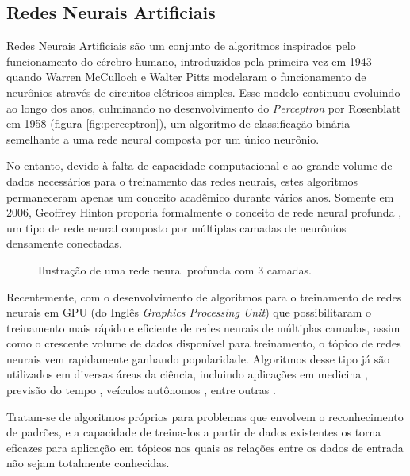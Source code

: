 \subsection{Redes Neurais Artificiais}
\label{sec:ann}

Redes Neurais Artificiais são um conjunto de algoritmos inspirados pelo funcionamento do cérebro humano, introduzidos pela primeira vez em 1943 quando Warren McCulloch e Walter Pitts modelaram o funcionamento de neurônios através de circuitos elétricos simples\cite{mccullochLogicalCalculusIdeas1943}. 
Esse modelo continuou evoluindo ao longo dos anos, culminando no desenvolvimento do \textit{Perceptron} por Rosenblatt em 1958 \cite{rosenblattPerceptronProbabilisticModel1958} (figura \ref{fig:perceptron}), um algoritmo de classificação binária semelhante a uma rede neural composta por um único neurônio.

No entanto, devido à falta de capacidade computacional e ao grande volume de dados necessários para o treinamento das redes neurais, estes algoritmos permaneceram apenas um conceito acadêmico durante vários anos.
Somente em 2006, Geoffrey Hinton proporia formalmente o conceito de rede neural profunda \cite{hintonFastLearningAlgorithm2006}, um tipo de rede neural composto por múltiplas camadas de neurônios densamente conectadas.

\begin{figure}[ht]
    \centering
    
    \caption{Ilustração de uma rede neural profunda com 3 camadas.}
    \label{fig:dnn}
\end{figure}

Recentemente, com o desenvolvimento de algoritmos para o treinamento de redes neurais em GPU (do Inglês \textit{Graphics Processing Unit}) que possibilitaram o treinamento mais rápido e eficiente de redes neurais de múltiplas camadas, assim como o crescente volume de dados disponível para treinamento, o tópico de redes neurais vem rapidamente ganhando popularidade.
Algoritmos desse tipo já são utilizados em diversas áreas da ciência, incluindo aplicações em medicina \cite{hannunCardiologistLevelArrhythmiaDetection2019,phamPredictingHealthcareTrajectories2017,houDeepSFDeepConvolutional2018}, previsão do tempo \cite{akramSequenceSequenceWeather2016}, veículos autônomos \cite{bojarskiEndEndLearning2016,peddagollaLaneDetectionAutonomous}, entre outras \cite{abiodunStateoftheartArtificialNeural2018}.

Tratam-se de algoritmos próprios para problemas que envolvem o reconhecimento de padrões, e a capacidade de treina-los a partir de dados existentes os torna eficazes para aplicação em tópicos nos quais as relações entre os dados de entrada não sejam totalmente conhecidas.

